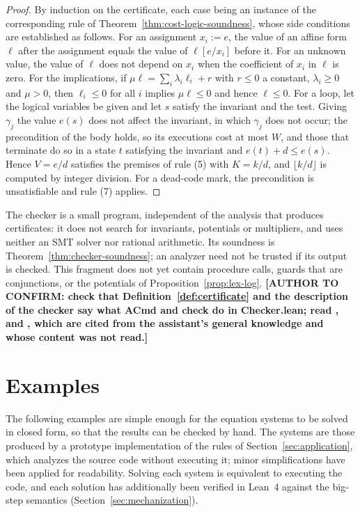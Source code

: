 \documentclass[oneside,english]{amsart}
\numberwithin{equation}{section}
\numberwithin{figure}{section}
\theoremstyle{plain}
\theoremstyle{definition}
\theoremstyle{plain}
\theoremstyle{remark}
\theoremstyle{plain}
\theoremstyle{definition}
\theoremstyle{plain}
\theoremstyle{remark}
\newcommand{\lean}[1]{{\ttfamily\small #1}}
\newcommand{\authortodo}[1]{\textbf{[AUTHOR TO CONFIRM: #1]}}
\begin{document}
\begin{proof}
By induction on the certificate, each case being an instance of the corresponding rule of Theorem~\ref{thm:cost-logic-soundness}, whose side conditions are established as follows. For an assignment $x_i := e$, the value of an affine form $\ell$ after the assignment equals the value of $\ell[e/x_i]$ before it. For an unknown value, the value of $\ell$ does not depend on $x_i$ when the coefficient of $x_i$ in $\ell$ is zero. For the implications, if $\mu \ell = \sum_i \lambda_i \ell_i + r$ with $r \le 0$ a constant, $\lambda_i \ge 0$ and $\mu > 0$, then $\ell_i \le 0$ for all $i$ implies $\mu \ell \le 0$ and hence $\ell \le 0$. For a loop, let the logical variables be given and let $s$ satisfy the invariant and the test. Giving $\gamma_j$ the value $e(s)$ does not affect the invariant, in which $\gamma_j$ does not occur; the precondition of the body holds, so its executions cost at most $W$, and those that terminate do so in a state $t$ satisfying the invariant and $e(t) + d \le e(s)$. Hence $V = e/d$ satisfies the premises of rule (5) with $K = k/d$, and $\lfloor k/d \rfloor$ is computed by integer division. For a dead-code mark, the precondition is unsatisfiable and rule (7) applies.
\end{proof}

The checker is a small program, independent of the analysis that produces certificates: it does not search for invariants, potentials or multipliers, and uses neither an SMT solver nor rational arithmetic. Its soundness is Theorem~\ref{thm:checker-soundness}; an analyzer need not be trusted if its output is checked. This fragment does not yet contain procedure calls, guards that are conjunctions, or the potentials of Proposition~\ref{prop:lex-log}. \authortodo{check that Definition~\ref{def:certificate} and the description of the checker say what \lean{ACmd} and \lean{check} do in Checker.lean; read \cite{necula1997proof}, \cite{nipkow2002hoare} and \cite{blumofe1999scheduling}, which are cited from the assistant's general knowledge and whose content was not read.}

\section{Examples}
\label{sec:examples}

The following examples are simple enough for the equation systems to be solved in closed form, so that the results can be checked by hand. The systems are those produced by a prototype implementation of the rules of Section~\ref{sec:application}, which analyzes the source code without executing it; minor simplifications have been applied for readability. Solving each system is equivalent to executing the code, and each solution has additionally been verified in Lean~4 against the big-step semantics (Section~\ref{sec:mechanization}).
\end{document}
